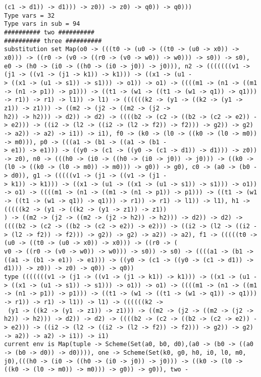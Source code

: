 \documentclass[11pt,oneside,a4paper]{report}
\begin{document}
\begin{lstlisting}[breaklines=true,caption={The output of an exponential type},label=lst:appedix:bigexp]
 (c1 -> d1)) -> d1))) -> z0)) -> z0) -> q0)) -> q0)))
Type vars = 32
Type vars in sub = 94
########## two ##########
########## three ##########
substitution set Map(o0 -> (((t0 -> (u0 -> ((t0 -> (u0 -> x0)) -> x0))) -> ((r0 -> (v0 -> ((r0 -> (v0 -> w0)) -> w0))) -> s0)) -> s0), e0 -> (h0 -> (i0 -> ((h0 -> (i0 -> j0)) -> j0))), n2 -> (((((((v1 -> (j1 -> ((v1 -> (j1 -> k1)) -> k1))) -> ((x1 -> (u1 -
> ((x1 -> (u1 -> s1)) -> s1))) -> o1)) -> o1) -> ((((m1 -> (n1 -> ((m1 -> (n1 -> p1)) -> p1))) -> ((t1 -> (w1 -> ((t1 -> (w1 -> q1)) -> q1))) -> r1)) -> r1) -> l1)) -> l1) -> ((((((k2 -> (y1 -> ((k2 -> (y1 -> z1)) -> z1))) -> ((m2 -> (j2 -> ((m2 -> (j2 ->
h2)) -> h2))) -> d2)) -> d2) -> ((((b2 -> (c2 -> ((b2 -> (c2 -> e2)) -> e2))) -> ((i2 -> (l2 -> ((i2 -> (l2 -> f2)) -> f2))) -> g2)) -> g2) -> a2)) -> a2) -> i1)) -> i1), f0 -> (k0 -> (l0 -> ((k0 -> (l0 -> m0)) -> m0))), p0 -> (((a1 -> (b1 -> ((a1 -> (b1 -
> e1)) -> e1))) -> ((y0 -> (c1 -> ((y0 -> (c1 -> d1)) -> d1))) -> z0)) -> z0), n0 -> (((h0 -> (i0 -> ((h0 -> (i0 -> j0)) -> j0))) -> ((k0 -> (l0 -> ((k0 -> (l0 -> m0)) -> m0))) -> g0)) -> g0), c0 -> (a0 -> (b0 -> d0)), g1 -> (((((v1 -> (j1 -> ((v1 -> (j1 -
> k1)) -> k1))) -> ((x1 -> (u1 -> ((x1 -> (u1 -> s1)) -> s1))) -> o1)) -> o1) -> ((((m1 -> (n1 -> ((m1 -> (n1 -> p1)) -> p1))) -> ((t1 -> (w1 -> ((t1 -> (w1 -> q1)) -> q1))) -> r1)) -> r1) -> l1)) -> l1), h1 -> (((((k2 -> (y1 -> ((k2 -> (y1 -> z1)) -> z1))
) -> ((m2 -> (j2 -> ((m2 -> (j2 -> h2)) -> h2))) -> d2)) -> d2) -> ((((b2 -> (c2 -> ((b2 -> (c2 -> e2)) -> e2))) -> ((i2 -> (l2 -> ((i2 -> (l2 -> f2)) -> f2))) -> g2)) -> g2) -> a2)) -> a2), f1 -> (((((t0 -> (u0 -> ((t0 -> (u0 -> x0)) -> x0))) -> ((r0 -> (
v0 -> ((r0 -> (v0 -> w0)) -> w0))) -> s0)) -> s0) -> ((((a1 -> (b1 -> ((a1 -> (b1 -> e1)) -> e1))) -> ((y0 -> (c1 -> ((y0 -> (c1 -> d1)) -> d1))) -> z0)) -> z0) -> q0)) -> q0))
type (((((((v1 -> (j1 -> ((v1 -> (j1 -> k1)) -> k1))) -> ((x1 -> (u1 -> ((x1 -> (u1 -> s1)) -> s1))) -> o1)) -> o1) -> ((((m1 -> (n1 -> ((m1 -> (n1 -> p1)) -> p1))) -> ((t1 -> (w1 -> ((t1 -> (w1 -> q1)) -> q1))) -> r1)) -> r1) -> l1)) -> l1) -> ((((((k2 ->
 (y1 -> ((k2 -> (y1 -> z1)) -> z1))) -> ((m2 -> (j2 -> ((m2 -> (j2 -> h2)) -> h2))) -> d2)) -> d2) -> ((((b2 -> (c2 -> ((b2 -> (c2 -> e2)) -> e2))) -> ((i2 -> (l2 -> ((i2 -> (l2 -> f2)) -> f2))) -> g2)) -> g2) -> a2)) -> a2) -> i1)) -> i1)
current env is Map(tuple -> Scheme(Set(a0, b0, d0),(a0 -> (b0 -> ((a0 -> (b0 -> d0)) -> d0)))), one -> Scheme(Set(k0, g0, h0, i0, l0, m0, j0),(((h0 -> (i0 -> ((h0 -> (i0 -> j0)) -> j0))) -> ((k0 -> (l0 -> ((k0 -> (l0 -> m0)) -> m0))) -> g0)) -> g0)), two -

\end{lstlisting}
\end{document}
